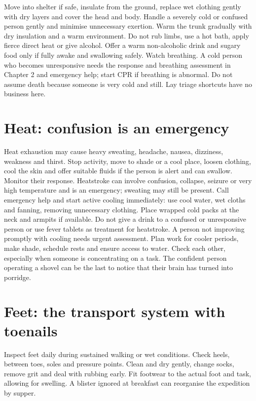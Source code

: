 \documentclass[10pt,openright]{book}
\begin{document}
Move into shelter if safe, insulate from the ground, replace wet clothing gently with dry layers and cover the head and body. Handle a severely cold or confused person gently and minimise unnecessary exertion. Warm the trunk gradually with dry insulation and a warm environment. Do not rub limbs, use a hot bath, apply fierce direct heat or give alcohol. Offer a warm non-alcoholic drink and sugary food only if fully awake and swallowing safely. Watch breathing. A cold person who becomes unresponsive needs the response and breathing assessment in Chapter 2 and emergency help; start CPR if breathing is abnormal. Do not assume death because someone is very cold and still. Lay triage shortcuts have no business here.

\section*{Heat: confusion is an emergency}
Heat exhaustion may cause heavy sweating, headache, nausea, dizziness, weakness and thirst. Stop activity, move to shade or a cool place, loosen clothing, cool the skin and offer suitable fluids if the person is alert and can swallow. Monitor their response. Heatstroke can involve confusion, collapse, seizure or very high temperature and is an emergency; sweating may still be present. Call emergency help and start active cooling immediately: use cool water, wet cloths and fanning, removing unnecessary clothing. Place wrapped cold packs at the neck and armpits if available. Do not give a drink to a confused or unresponsive person or use fever tablets as treatment for heatstroke. A person not improving promptly with cooling needs urgent assessment. Plan work for cooler periods, make shade, schedule rests and ensure access to water. Check each other, especially when someone is concentrating on a task. The confident person operating a shovel can be the last to notice that their brain has turned into porridge.

\section*{Feet: the transport system with toenails}
Inspect feet daily during sustained walking or wet conditions. Check heels, between toes, soles and pressure points. Clean and dry gently, change socks, remove grit and deal with rubbing early. Fit footwear to the actual foot and task, allowing for swelling. A blister ignored at breakfast can reorganise the expedition by supper.
\end{document}
